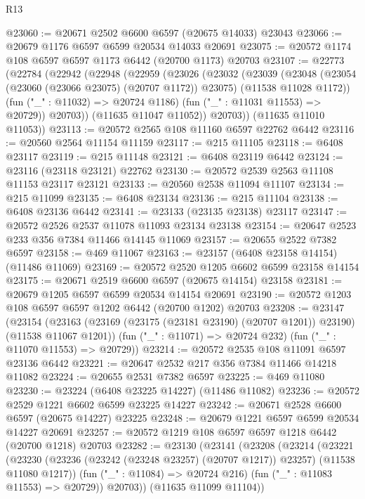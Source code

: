 \begin{lexlean}{R13}
\begin{coremodule}
@23060 := @20671 @2502 @6600 @6597 (@20675 @14033) @23043
@23066 := @20679 @1176 @6597 @6599 @20534 @14033 @20691
@23075 := @20572 @1174 @108 @6597 @6597 @1173 @6442 (@20700 @1173) @20703
@23107 := @22773
    (@22784
      (@22942
        (@22948
          (@22959
            (@23026
              (@23032
                (@23039
                  (@23048
                    (@23054 (@23060 (@23066 @23075) (@20707 @1172)) @23075)
                    (@11538 @11028 @1172))
                  (fun ("_" : @11032) => @20724 @1186)
                  (fun ("_" : @11031 @11553) => @20729))
                @20703))
            (@11635 @11047 @11052))
          @20703))
      (@11635 @11010 @11053))
@23113 := @20572 @2565 @108 @11160 @6597 @22762 @6442
@23116 := @20560 @2564 @11154 @11159
@23117 := @215 @11105
@23118 := @6408 @23117
@23119 := @215 @11148
@23121 := @6408 @23119 @6442
@23124 := @23116 (@23118 @23121) @22762
@23130 := @20572 @2539 @2563 @11108 @11153 @23117 @23121
@23133 := @20560 @2538 @11094 @11107
@23134 := @215 @11099
@23135 := @6408 @23134
@23136 := @215 @11104
@23138 := @6408 @23136 @6442
@23141 := @23133 (@23135 @23138) @23117
@23147 := @20572 @2526 @2537 @11078 @11093 @23134 @23138
@23154 := @20647 @2523 @233 @356 @7384 @11466 @14145 @11069
@23157 := @20655 @2522 @7382 @6597
@23158 := @469 @11067
@23163 := @23157 (@6408 @23158 @14154) (@11486 @11069)
@23169 := @20572 @2520 @1205 @6602 @6599 @23158 @14154
@23175 := @20671 @2519 @6600 @6597 (@20675 @14154) @23158
@23181 := @20679 @1205 @6597 @6599 @20534 @14154 @20691
@23190 := @20572 @1203 @108 @6597 @6597 @1202 @6442 (@20700 @1202) @20703
@23208 := @23147
    (@23154
      (@23163 (@23169 (@23175 (@23181 @23190) (@20707 @1201)) @23190) (@11538 @11067 @1201))
      (fun ("_" : @11071) => @20724 @232)
      (fun ("_" : @11070 @11553) => @20729))
@23214 := @20572 @2535 @108 @11091 @6597 @23136 @6442
@23221 := @20647 @2532 @217 @356 @7384 @11466 @14218 @11082
@23224 := @20655 @2531 @7382 @6597
@23225 := @469 @11080
@23230 := @23224 (@6408 @23225 @14227) (@11486 @11082)
@23236 := @20572 @2529 @1221 @6602 @6599 @23225 @14227
@23242 := @20671 @2528 @6600 @6597 (@20675 @14227) @23225
@23248 := @20679 @1221 @6597 @6599 @20534 @14227 @20691
@23257 := @20572 @1219 @108 @6597 @6597 @1218 @6442 (@20700 @1218) @20703
@23282 := @23130
    (@23141
      (@23208
        (@23214
          (@23221
            (@23230 (@23236 (@23242 (@23248 @23257) (@20707 @1217)) @23257) (@11538 @11080 @1217))
            (fun ("_" : @11084) => @20724 @216)
            (fun ("_" : @11083 @11553) => @20729))
          @20703))
      (@11635 @11099 @11104))

\end{coremodule}
\end{lexlean}
